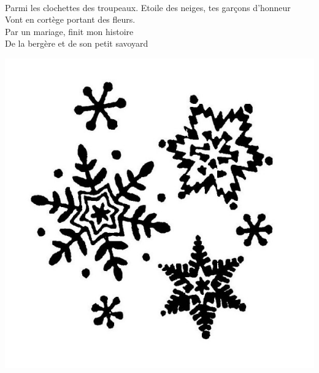 \\Parmi les clochettes des troupeaux.
\breakpage
Etoile des neiges, tes garçons d'honneur
\\Vont en cortège portant des fleurs.
\\Par un mariage, finit mon histoire
\\De la bergère et de son petit savoyard
\\
\bigskip
\begin{center}
\includegraphics[width=1\textwidth]{images/flocon-de-neige.jpg}
\end{center}

\breakpage